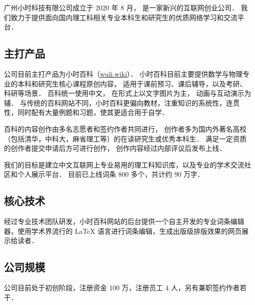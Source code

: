 
广州小时科技有限公司成立于 2020 年 8 月， 是一家新兴的互联网创业公司． 我们致力于提供面向国内理工科相关专业本科生和研究生的优质网络学习和交流平台．

\subsection{主打产品}
公司目前主打产品为小时百科（\href{http://wuli.wiki}{wuli.wiki}）． 小时百科目前主要提供数学与物理专业的本科和研究生核心课程原创内容， 适用于课前预习、课后辅导，以及考研、科研等场景． 百科统一使用中文， 在形式上以文字图片为主， 动画与互动演示为辅． 与传统的百科网站不同，小时百科更偏向教材，注重知识的系统性，连贯性，同时配有大量例题和习题，使其更适合用于自学．

百科的内容创作由多名志愿者和签约作者共同进行， 创作者多为国内外著名高校（包括清华，中科大，麻省理工等）的在读研究生或优秀本科生． 满足一定资质的创作者提交申请后方可进行创作， 创作内容经过内部评议后发布上线．

我们的目标是建立中文互联网上专业易用的理工科知识库，以及专业的学术交流社区和个人展示平台． 目前已上线词条 800 多个，共计约 90 万字．

\subsection{核心技术}
经过专业技术团队研发，小时百科网站的后台提供一个自主开发的专业词条编辑器，使用学术界流行的 LaTeX 语言进行词条编辑，生成出版级排版效果的网页展示给读者．

\subsection{公司规模}
公司目前处于初创阶段，注册资金 100 万，注册员工 4 人，另有兼职签约作者若干．
